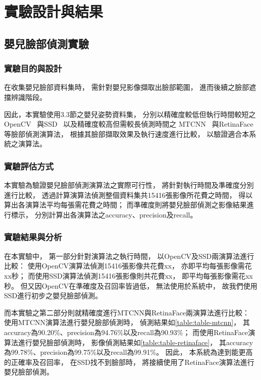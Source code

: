 \documentclass[class=NCU_thesis, crop=false]{standalone}
\begin{document}
\chapter{實驗設計與結果}

\section{嬰兒臉部偵測實驗}
\subsection{實驗目的與設計}
在收集嬰兒臉部資料集時，
需針對嬰兒影像擷取出臉部範圍，
進而後續之臉部遮擋辨識階段。

因此，本實驗使用3.3節之嬰兒姿勢資料集，
分別以精確度較低但執行時間較短之
OpenCV~\cite{goyal_face_2017}
與SSD~\cite{ye_face_2021}
以及精確度較高但需較長偵測時間之
MTCNN~\cite{xiang_joint_2017}
與RetinaFace~\cite{deng_retinaface_2020}
等臉部偵測演算法，
根據其臉部擷取效果及執行速度進行比較，
以驗證適合本系統之演算法。

\subsection{實驗評估方式}
本實驗為驗證嬰兒臉部偵測演算法之實際可行性，
將針對執行時間及準確度分別進行比較，
透過計算演算法偵測整個資料集共15416張影像所花費之時間，
得以算出各演算法平均每張需花費之時間；
而準確度則將嬰兒臉部偵測之影像結果進行標示，
分別計算出各演算法之accuracy、precision及recall。

\subsection{實驗結果與分析}
在本實驗中，
第一部分針對演算法之執行時間，
以OpenCV及SSD兩演算法進行比較：
使用OpenCV演算法偵測15416張影像共花費xx，
亦即平均每張影像需花xx秒；
而使用SSD演算法偵測15416張影像則共花費xx，
即平均每張影像需花xx秒。
但又因OpenCV在準確度及召回率皆過低，
無法使用於系統中，
故我們使用SSD進行初步之嬰兒臉部偵測。

而本實驗之第二部分則就精確度進行MTCNN與RetinaFace兩演算法進行比較：
使用MTCNN演算法進行嬰兒臉部偵測時，
偵測結果如\cref{table:table-mtcnn}，
其accuracy為90.20\%、precision為94.76\%以及recall為90.93\%；
而使用RetinaFace演算法進行嬰兒臉部偵測時，
影像偵測結果如\cref{table:table-retinaface}，
其accuracy為99.78\%、precision為99.75\%以及recall為99.91\%。
因此，
本系統為達到能更高的正確率及召回率，
在SSD找不到臉部時，
將接續使用了RetinaFace演算法進行嬰兒臉部偵測。
\end{document}
